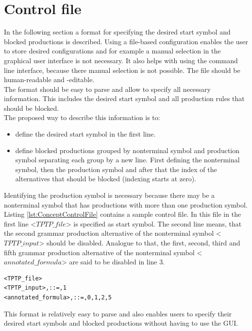 \section{Control file}\label{sec:ConceptControlFile}
In the following section a format for specifying the desired start symbol and blocked productions is described.
Using a file-based configuration enables the user to store desired configurations and for example a manual selection in the graphical user interface is not necessary.
It also helps with using the command line interface, because there manual selection is not possible.
The file should be human-readable and -editable.\\
The format should be easy to parse and allow to specify all necessary information.
This includes the desired start symbol and all production rules that should be blocked.\\
The proposed way to describe this information is to:

\begin{itemize}%
	\item define the desired start symbol in the first line.
	\item define blocked productions grouped by nonterminal symbol and production symbol separating each group by a new line.
	First defining the nonterminal symbol, then the production symbol and after that the index of the alternatives that should be blocked (indexing starts at zero). 
\end{itemize}

Identifying the production symbol is necessary because there may be a nonterminal symbol that has productions with more than one production symbol.\\
Listing \ref{lst:ConceptControlFile} contains a sample control file. In this file in the first line <$TPTP\_file$> is specified as start symbol.
The second line means, that the second grammar production alternative of the nonterminal symbol <$TPTP\_input$> should be disabled.
Analogue to that, the first, second, third and fifth grammar production alternative of the nonterminal symbol <$annotated\_formula$> are said to be disabled in line 3.

\begin{lstlisting}[caption= Control file,label= lst:ConceptControlFile]
<TPTP_file>
<TPTP_input>,::=,1
<annotated_formula>,::=,0,1,2,5
\end{lstlisting}
This format is relatively easy to parse and also enables users to specify their desired start symbols and blocked productions without having to use the GUI.

